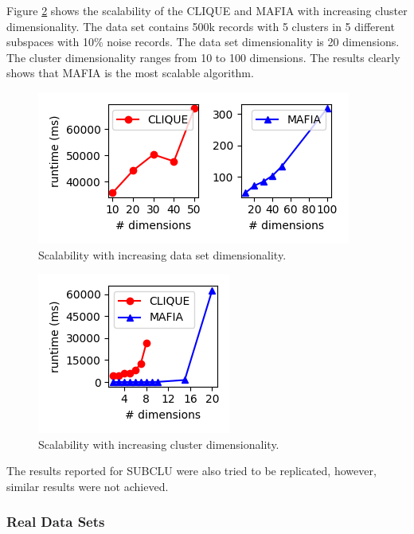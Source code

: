 Figure \ref{fig:cluster_dimensionality_vs_runtime} shows the scalability of the CLIQUE and MAFIA with increasing cluster dimensionality. The data set contains 500k records with 5 clusters in 5 different subspaces with 10\% noise records. The data set dimensionality is 20 dimensions. The cluster dimensionality ranges from 10 to 100 dimensions. The results clearly shows that MAFIA is the most scalable algorithm.
\begin{figure}
    \centering
    \includegraphics[scale=0.6]{figures/data_dimensionality_vs_runtime.png}
    \caption{Scalability with increasing data set dimensionality.}
    \label{fig:dataset_dimensionality_vs_runtime}
\end{figure}

\begin{figure}
    \centering
    \includegraphics[scale=0.6]{figures/cluster_dimensionality_vs_runtime.png}
    \caption{Scalability with increasing cluster dimensionality.}
    \label{fig:cluster_dimensionality_vs_runtime}
\end{figure}

The results reported for SUBCLU \cite{subclu} were also tried to be replicated, however, similar results were not achieved.




\subsubsection{Real Data Sets}